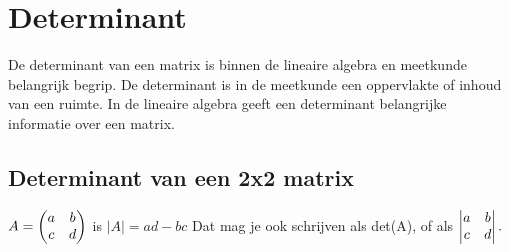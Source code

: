 \documentclass[hidelinks, a4wide, 12pt,  twoside]{book}
\begin{document}
\chapter{Determinant}
\label{chap: Determinant}
De determinant van een matrix is binnen de lineaire algebra en meetkunde belangrijk begrip. De determinant is in de meetkunde een oppervlakte of inhoud van een ruimte. In de lineaire algebra geeft een determinant belangrijke informatie over een matrix.
\section{Determinant van een 2x2 matrix}
{ $ A = \begin{pmatrix} a & b \\ c & d \end{pmatrix} $ 
	\quad is \quad $ |A| = ad - bc $ }
Dat mag je ook schrijven als \quad det(A), \quad of als 
\quad $  \begin{vmatrix} a & b \\ c & d \end{vmatrix}.  $ \\ \\
\end{document}
